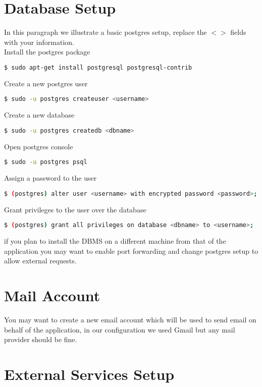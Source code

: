 \section{Database Setup}

In this paragraph we illustrate a basic postgres setup, replace the $<>$ fields with your information.\\

\noindent Install the postgres package
\begin{lstlisting}[language=bash]
$ sudo apt-get install postgresql postgresql-contrib
\end{lstlisting}
\bigskip
Create a new postgres user
\begin{lstlisting}[language=bash]
$ sudo -u postgres createuser <username>
\end{lstlisting}
\bigskip
Create a new database
\begin{lstlisting}[language=bash]
$ sudo -u postgres createdb <dbname>
\end{lstlisting}
\bigskip
Open postgres console
\begin{lstlisting}[language=bash]
$ sudo -u postgres psql
\end{lstlisting}
\bigskip
Assign a password to the user
\begin{lstlisting}[language=bash]
$ (postgres) alter user <username> with encrypted password <password>;
\end{lstlisting}
\bigskip
Grant privileges to the user over the database
\begin{lstlisting}[language=bash]
$ (postgres) grant all privileges on database <dbname> to <username>;
\end{lstlisting}
\bigskip
\noindent
if you plan to install the DBMS on a different machine from that of the application you may want to enable port forwarding and change postgres setup to allow external requests.

\section{Mail Account}

You may want to create a new email account which will be used to send email on behalf of the application, in our configuration we used Gmail but any mail provider should be fine.

\section{External Services Setup}

